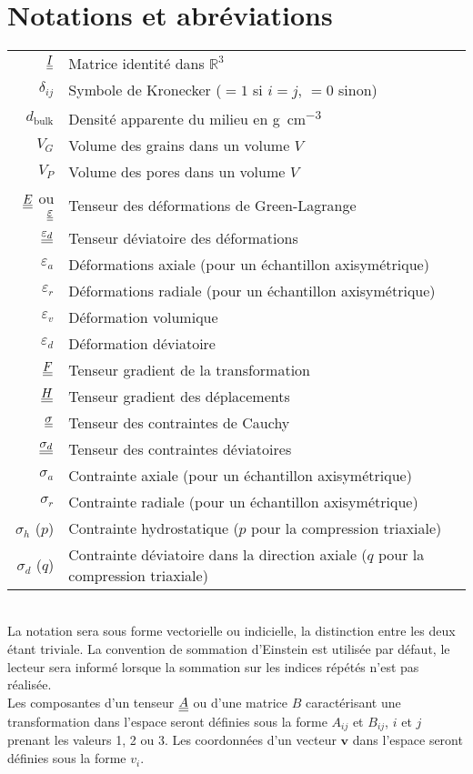 \chapter*{Notations et abréviations}\label{keywords}

\begin{tabular}{r@{\hspace{.5cm}}l}
	$\underline{\underline{I}}$ & Matrice identité dans $\mathbb{R}^3$\\
	$\delta_{ij}$ & Symbole de Kronecker ($=1$ si $i=j$, $=0$ sinon)\\
	$d_\text{bulk}$ & Densité apparente du milieu en \si{\gram\per\centi\meter^3}\\
	$V_G$ & Volume des grains dans un volume $V$\\
	$V_P$ & Volume des pores dans un volume $V$\\
	$\underline{\underline{E}}$ ou $\underline{\underline{\varepsilon}}$ & Tenseur des déformations de Green-Lagrange\\
	$\underline{\underline{\varepsilon_d}}$ & Tenseur déviatoire des déformations\\
	$\varepsilon_a$ & Déformations axiale (pour un échantillon axisymétrique)\\
	$\varepsilon_r$ & Déformations radiale (pour un échantillon axisymétrique)\\
	$\varepsilon_v$ & Déformation volumique\\
	$\varepsilon_d$ & Déformation déviatoire\\
	$\underline{\underline{F}}$ & Tenseur gradient de la transformation\\
	$\underline{\underline{H}}$ & Tenseur gradient des déplacements\\
	$\underline{\underline{\sigma}}$ & Tenseur des contraintes de Cauchy\\
	$\underline{\underline{\sigma_d}}$ & Tenseur des contraintes déviatoires\\
	$\sigma_a$ & Contrainte axiale (pour un échantillon axisymétrique)\\
	$\sigma_r$ & Contrainte radiale (pour un échantillon axisymétrique)\\
	$\sigma_h$ ($p$) & Contrainte hydrostatique ($p$ pour la compression triaxiale)\\
	$\sigma_d$ ($q$) & Contrainte déviatoire dans la direction axiale ($q$ pour la compression triaxiale)\\
\end{tabular}
\vspace{1cm}\\
La notation sera sous forme vectorielle ou indicielle, la distinction entre les deux étant triviale. La convention de sommation d'Einstein est utilisée par défaut, le lecteur sera informé lorsque la sommation sur les indices répétés n'est pas réalisée.
\\Les composantes d'un tenseur $\underline{\underline{A}}$ ou d'une matrice $B$ caractérisant une transformation dans l'espace seront définies sous la forme $A_{ij}$ et $B_{ij}$, $i$ et $j$ prenant les valeurs \num{1}, \num{2} ou \num{3}. Les coordonnées d'un vecteur $\bm{v}$ dans l'espace seront définies sous la forme $v_i$.